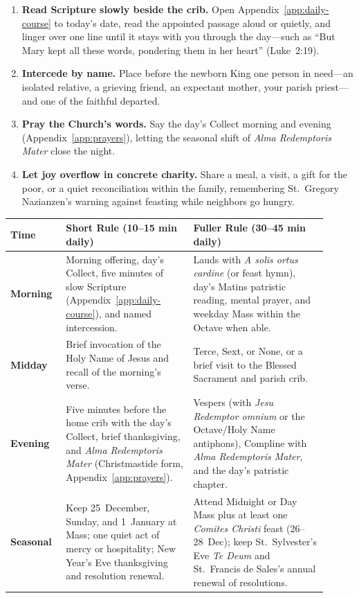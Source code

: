 \begin{enumerate}
\item \textbf{Read Scripture slowly beside the crib.} Open
Appendix~\ref{app:daily-course} to today's date, read the appointed passage
aloud or quietly, and linger over one line until it stays with you through the
day---such as ``But Mary kept all these words, pondering them in her heart''
(Luke~2:19).
\item \textbf{Intercede by name.} Place before the newborn King one person in
need---an isolated relative, a grieving friend, an expectant mother, your parish
priest---and one of the faithful departed.
\item \textbf{Pray the Church's words.} Say the day's Collect morning and
evening (Appendix~\ref{app:prayers}), letting the seasonal shift of \textit{Alma
Redemptoris Mater} close the night.
\item \textbf{Let joy overflow in concrete charity.} Share a meal, a visit, a
gift for the poor, or a quiet reconciliation within the family, remembering
St.~Gregory Nazianzen's warning against feasting while neighbors go hungry.
\end{enumerate}

{\footnotesize
\begin{longtable}{>{\raggedright\arraybackslash}p{0.15\linewidth}>{\raggedright\arraybackslash}p{0.37\linewidth}>{\raggedright\arraybackslash}p{0.39\linewidth}}
\toprule
\textbf{Time} & \textbf{Short Rule (10--15 min daily)} & \textbf{Fuller Rule (30--45 min daily)} \\
\midrule
\endhead
\textbf{Morning} & Morning offering, day's Collect, five minutes of slow Scripture (Appendix~\ref{app:daily-course}), and named intercession. & Lauds with \textit{A solis ortus cardine} (or feast hymn), day's Matins patristic reading, mental prayer, and weekday Mass within the Octave when able. \\
\textbf{Midday} & Brief invocation of the Holy Name of Jesus and recall of the morning's verse. & Terce, Sext, or None, or a brief visit to the Blessed Sacrament and parish crib. \\
\textbf{Evening} & Five minutes before the home crib with the day's Collect, brief thanksgiving, and \textit{Alma Redemptoris Mater} (Christmastide form, Appendix~\ref{app:prayers}). & Vespers (with \textit{Jesu Redemptor omnium} or the Octave/Holy Name antiphons), Compline with \textit{Alma Redemptoris Mater}, and the day's patristic chapter. \\
\textbf{Seasonal} & Keep 25~December, Sunday, and 1~January at Mass; one quiet act of mercy or hospitality; New Year's Eve thanksgiving and resolution renewal. & Attend Midnight or Day Mass plus at least one \textit{Comites Christi} feast (26--28~Dec); keep St.~Sylvester's Eve \textit{Te Deum} and St.~Francis de Sales's annual renewal of resolutions. \\
\bottomrule
\end{longtable}
}

